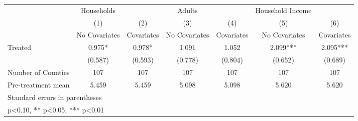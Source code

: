 {
\def\sym#1{\ifmmode^{#1}\else\(^{#1}\)\fi}
\begin{tabular}{l*{6}{c}}
\hline\hline
            &  Households   &               &      Adults   &               &Household Income   &               \\
            &\multicolumn{1}{c}{(1)}&\multicolumn{1}{c}{(2)}&\multicolumn{1}{c}{(3)}&\multicolumn{1}{c}{(4)}&\multicolumn{1}{c}{(5)}&\multicolumn{1}{c}{(6)}\\
            &\multicolumn{1}{c}{No Covariates}&\multicolumn{1}{c}{Covariates}&\multicolumn{1}{c}{No Covariates}&\multicolumn{1}{c}{Covariates}&\multicolumn{1}{c}{No Covariates}&\multicolumn{1}{c}{Covariates}\\
\hline
Treated     &       0.975*  &       0.978*  &       1.091   &       1.052   &       2.099***&       2.095***\\
            &     (0.587)   &     (0.593)   &     (0.778)   &     (0.804)   &     (0.652)   &     (0.689)   \\
\hline
Number of Counties&         107   &         107   &         107   &         107   &         107   &         107   \\
Pre-treatment mean&       5.459   &       5.459   &       5.098   &       5.098   &       5.620   &       5.620   \\
\hline\hline
\multicolumn{7}{l}{\footnotesize Standard errors in parentheses}\\
\multicolumn{7}{l}{\footnotesize * p<0.10, ** p<0.05, *** p<0.01}\\
\end{tabular}
}
